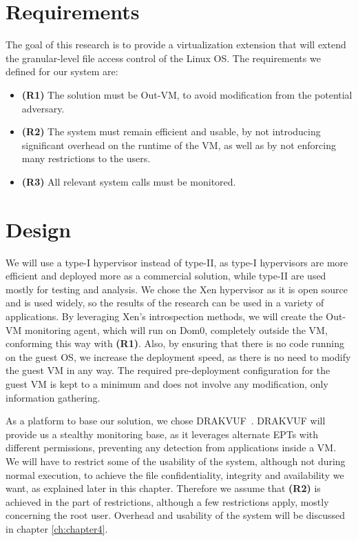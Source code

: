 \section{Requirements}\label{sec:requirements}
The goal of this research is to provide a virtualization extension that will extend the granular-level file access control of the Linux \ac{OS}. The requirements we defined for our system are:
\begin{itemize}
	\item \textbf{(R1)} The solution must be Out-VM, to avoid modification from the potential adversary. 
	\item \textbf{(R2)} The system must remain efficient and usable, by not introducing significant overhead on the runtime of the \ac{VM}, as well as by not enforcing many restrictions to the users. 
	\item \textbf{(R3)} All relevant system calls must be monitored.
\end{itemize}


\section{Design}\label{sec:design}

\par We will use a type-I hypervisor instead of type-II, as type-I hypervisors are more efficient and deployed more as a commercial solution, while type-II are used mostly for testing and analysis. We chose the Xen hypervisor as it is open source and is used widely, so the results of the research can be used in a variety of applications. By leveraging Xen's introspection methods, we will create the Out-VM monitoring agent, which will run on Dom0, completely outside the \ac{VM}, conforming this way with \textbf{(R1)}. Also, by ensuring that there is no code running on the guest \ac{OS}, we increase the deployment speed, as there is no need to modify the guest \ac{VM} in any way. The required pre-deployment configuration for the guest \ac{VM} is kept to a minimum and does not involve any modification, only information gathering.

\par As a platform to base our solution, we chose DRAKVUF~\cite{lengyel2014drakvuf}. DRAKVUF will provide us a stealthy monitoring base, as it leverages alternate \ac{EPT}s with different permissions, preventing any detection from applications inside a \ac{VM}. We will have to restrict some of the usability of the system, although not during normal execution, to achieve the file confidentiality, integrity and availability we want, as explained later in this chapter. Therefore we assume that \textbf{(R2)} is achieved in the part of restrictions, although a few restrictions apply, mostly concerning the root user. Overhead and usability of the system will be discussed in chapter \ref{ch:chapter4}.

